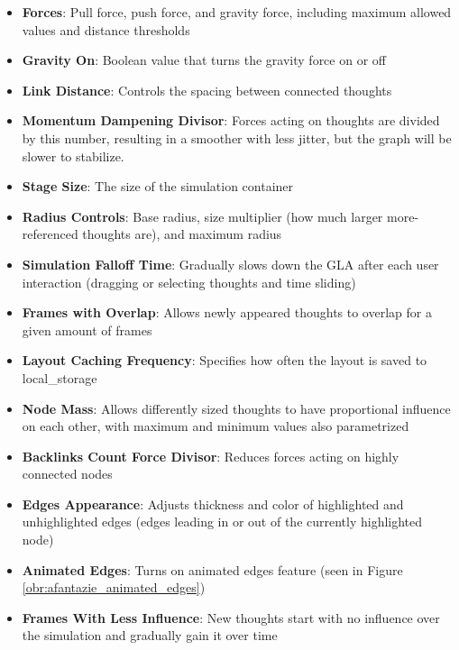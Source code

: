\label{sec:graph_layout_parameters}
\begin{itemize}
  \item \textbf{Forces}: Pull force, push force, and gravity force, including maximum allowed values and distance thresholds
  \item \textbf{Gravity On}: Boolean value that turns the gravity force on or off 
  \item \textbf{Link Distance}: Controls the spacing between connected thoughts
  \item \textbf{Momentum Dampening Divisor}: Forces acting on thoughts are divided by this number, resulting in a smoother with less jitter, but the graph will be slower to stabilize.
  \item \textbf{Stage Size}: The size of the simulation container
  \item \textbf{Radius Controls}: Base radius, size multiplier (how much larger more-referenced thoughts are), and maximum radius
  \item \textbf{Simulation Falloff Time}: Gradually slows down the \gls{GLA} after each user interaction (dragging or selecting thoughts and time sliding)
  \item \textbf{Frames with Overlap}: Allows newly appeared thoughts to overlap for a given amount of frames
  \item \textbf{Layout Caching Frequency}: Specifies how often the layout is saved to \gls{local_storage}
  \item \textbf{Node Mass}: Allows differently sized thoughts to have proportional influence on each other, with maximum and minimum values also parametrized
  \item \textbf{Backlinks Count Force Divisor}: Reduces forces acting on highly connected nodes
  \item \textbf{Edges Appearance}: Adjusts thickness and color of highlighted and unhighlighted edges (edges leading in or out of the currently highlighted node)
  \item \textbf{Animated Edges}: Turns on animated edges feature (seen in Figure \ref{obr:afantazie_animated_edges})
  \item \textbf{Frames With Less Influence}: New thoughts start with no influence over the simulation and gradually gain it over time
\end{itemize}
